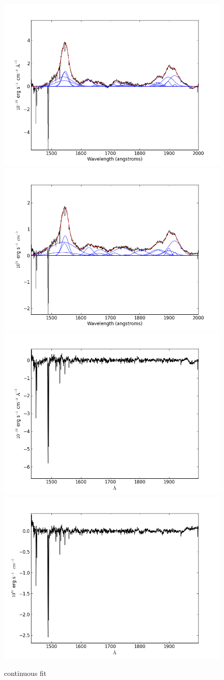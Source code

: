 \documentclass[usenatbib]{mn2e}
\begin{document}
\begin{figure}
\begin{center}
\includegraphics[width=0.46\linewidth,angle=0]{C_0.png}
\vspace{5mm}
\includegraphics[width=0.49\linewidth,angle=0]{C_1.png}\\
\includegraphics[width=0.46\linewidth,angle=0]{C_res_0.png}
\hspace{5mm}
\includegraphics[width=0.49\linewidth,angle=0]{C_res_1.png}\\
\end{center} 
\caption{continuous fit \label{fig:landscape}}   
\end{figure}
\end{document}
